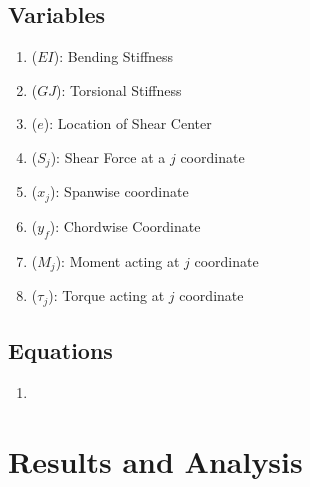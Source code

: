 \documentclass{article}
\begin{document}
\subsection*{Variables}
\begin{enumerate}[label = \roman*.]
  \item (\(EI\)): Bending Stiffness
  \item (\(GJ\)): Torsional Stiffness
  \item (\(e\)): Location of Shear Center
  \item (\(S_{j}\)): Shear Force at a \(j\) coordinate
  \item (\(x_{j}\)): Spanwise coordinate
  \item (\(y_{f}\)): Chordwise Coordinate
  \item (\(M_{j}\)): Moment acting at \(j\) coordinate
  \item (\(\tau_{j}\)): Torque acting at \(j\) coordinate
\end{enumerate}

\subsection*{Equations}
\begin{enumerate}[label = \Roman*.]
    \item 
\end{enumerate} 


\section{Results and Analysis}
\end{document}
